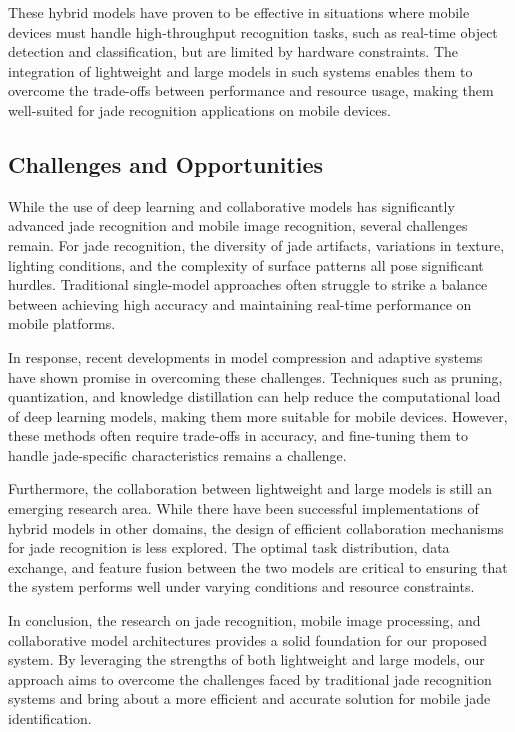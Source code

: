 These hybrid models have proven to be effective in situations where mobile devices must handle high-throughput recognition tasks, such as real-time object detection and classification, but are limited by hardware constraints. The integration of lightweight and large models in such systems enables them to overcome the trade-offs between performance and resource usage, making them well-suited for jade recognition applications on mobile devices.

\subsection{Challenges and Opportunities}

While the use of deep learning and collaborative models has significantly advanced jade recognition and mobile image recognition, several challenges remain. For jade recognition, the diversity of jade artifacts, variations in texture, lighting conditions, and the complexity of surface patterns all pose significant hurdles. Traditional single-model approaches often struggle to strike a balance between achieving high accuracy and maintaining real-time performance on mobile platforms.

In response, recent developments in model compression and adaptive systems have shown promise in overcoming these challenges. Techniques such as pruning, quantization, and knowledge distillation can help reduce the computational load of deep learning models, making them more suitable for mobile devices. However, these methods often require trade-offs in accuracy, and fine-tuning them to handle jade-specific characteristics remains a challenge.

Furthermore, the collaboration between lightweight and large models is still an emerging research area. While there have been successful implementations of hybrid models in other domains, the design of efficient collaboration mechanisms for jade recognition is less explored. The optimal task distribution, data exchange, and feature fusion between the two models are critical to ensuring that the system performs well under varying conditions and resource constraints.

In conclusion, the research on jade recognition, mobile image processing, and collaborative model architectures provides a solid foundation for our proposed system. By leveraging the strengths of both lightweight and large models, our approach aims to overcome the challenges faced by traditional jade recognition systems and bring about a more efficient and accurate solution for mobile jade identification.